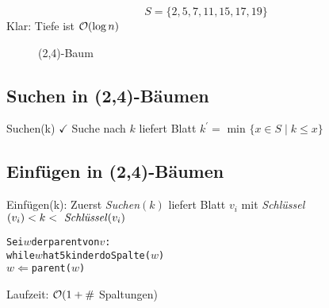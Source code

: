         \begin{bsp}
            $$S=\{2,5,7,11,15,17,19 \}$$ 
            Klar: Tiefe ist $\mathcal{O}(\log n)$
            \begin{figure}
            	
            	\caption{(2,4)-Baum}
            \end{figure}
            
        \end{bsp}

        \subsection{Suchen in (2,4)-Bäumen}
            Suchen(k) $\checkmark$ \qquad Suche nach $k$ liefert Blatt $k^{'} = \text{ min }\{x \in S \mid k \leq x \}$ 
            
        \subsection{Einfügen in (2,4)-Bäumen}
            Einfügen(k): Zuerst \textit{Suchen}$(k)$ liefert Blatt $v_i$ mit \textit{Schlüssel} $(v_i) < k < \text{\textit{ Schlüssel}} (v_i) $ \\

        \begin{alltt}
            Sei \( w \) der parent von \( v \) : \\
            while \( w \) hat 5 kinder do Spalte(\( w \)) 
            \( w \) \( \Leftarrow \) parent(\( w \)) 
        \end{alltt}

        Laufzeit: $\mathcal{O}(1+ \#$ Spaltungen) \\
        
        
